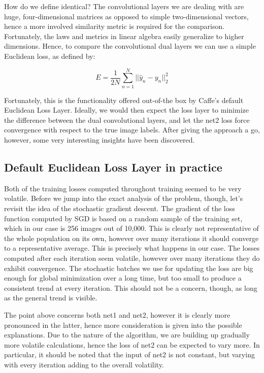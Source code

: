 \documentclass[a4paper, 12pt]{article}
\numberwithin{equation}{section}
\begin{document}
	How do we define identical? The convolutional layers we are dealing with are huge, four-dimensional matrices as opposed to simple two-dimensional vectors, hence a more involved similarity metric is required for the comparison. Fortunately, the laws and metrics in linear algebra easily generalize to higher dimensions. Hence, to compare the convolutional dual layers we can use a simple Euclidean loss, as defined by:
	
	\begin{equation} \label{euclidean_loss_formula}
		E=\frac{1}{2N} \sum_{n=1}^{N} ||\hat{y}_n-y_n||^2_2
	\end{equation}
	
	Fortunately, this is the functionality offered out-of-the box by Caffe's default Euclidean Loss Layer. Ideally, we would then expect the loss layer to minimize the difference between the dual convolutional layers, and let the net2 loss force convergence with respect to the true image labels. After giving the approach a go, however, some very interesting insights have been discovered.
		
	\subsection{Default Euclidean Loss Layer in practice}
	
	Both of the training losses computed throughout training seemed to be very volatile. Before we jump into the exact analysis of the problem, though, let's revisit the idea of the stochastic gradient descent. The gradient of the loss function computed by SGD is based on a random sample of the training set, which in our case is 256 images out of 10,000. This is clearly not representative of the whole population on its own, however over many iterations it should converge to a representative average. This is precisely what happens in our case. The losses computed after each iteration seem volatile, however over many iterations they do exhibit convergence. The stochastic batches we use for updating the loss are big enough for global minimization over a long time, but too small to produce a consistent trend at every iteration. This should not be a concern, though, as long as the general trend is visible.
	
	The point above concerns both net1 and net2, however it is clearly more pronounced in the latter, hence more consideration is given into the possible explanations. Due to the nature of the algorithm, we are building up gradually more volatile calculations, hence the loss of net2 can be expected to vary more. In particular, it should be noted that the input of net2 is not constant, but varying with every iteration adding to the overall volatility.
	
\end{document}

